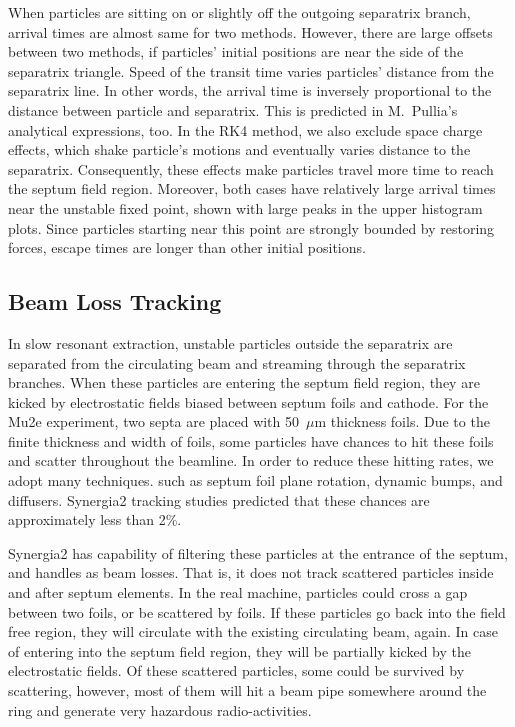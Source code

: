 \documentclass[aps,prstab,onecolumn,preprint]{revtex4-1}
\begin{document}
When particles are sitting on or slightly off the outgoing separatrix branch, arrival times are almost same for two methods. However, there are large offsets between two methods, if particles' initial positions are near the side of the separatrix triangle. Speed of the transit time varies particles' distance from the separatrix line. In other words, the arrival time is inversely proportional to the distance between particle and separatrix. This is predicted in M.~Pullia's analytical expressions, too. In the RK4 method, we also exclude space charge effects, which shake particle's motions and eventually varies distance to the separatrix. Consequently, these effects make particles travel more time to reach the septum field region. Moreover, both cases have relatively large arrival times near the unstable fixed point, shown with large peaks in the upper histogram plots. Since particles starting near this point are strongly bounded by restoring forces, escape times are longer than other initial positions. 


\subsection{\label{sec:beamloss}Beam Loss Tracking}

In slow resonant extraction, unstable particles outside the separatrix are separated from the circulating beam and streaming through the separatrix branches. When these particles are entering the septum field region, they are kicked by electrostatic fields biased between septum foils and cathode. For the Mu2e experiment, two septa are placed with 50~$\mu$m thickness foils. Due to the finite thickness and width of foils, some particles have chances to hit these foils and scatter throughout the beamline. In order to reduce these hitting rates, we adopt many techniques. such as septum foil plane rotation, dynamic bumps, and diffusers. Synergia2 tracking studies predicted that these chances are approximately less than 2\%. 

Synergia2 has capability of filtering these particles at the entrance of the septum, and handles as beam losses. That is, it does not track scattered particles inside and after septum elements. In the real machine, particles could cross a gap between two foils, or be scattered by foils. If these particles go back into the field free region, they will circulate with the existing circulating beam, again. In case of entering into the septum field region, they will be partially kicked by the electrostatic fields. Of these scattered particles, some could be survived by scattering, however, most of them will hit a beam pipe somewhere around the ring and generate very hazardous radio-activities.
\end{document}
